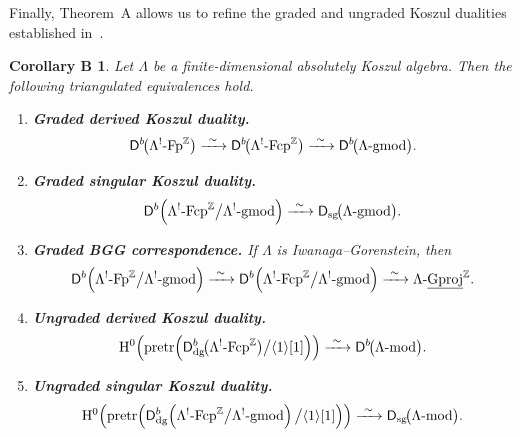 \documentclass[11pt]{article}
\newtheorem*{corollaryB}{\textbf{Corollary B}}
\theoremstyle{definition}
\theoremstyle{remark}
\begin{document}
\medskip

Finally, Theorem~A allows us to refine the graded and ungraded Koszul dualities established in~\cite{4}.

\begin{corollaryB}
Let \(\Lambda\) be a finite-dimensional absolutely Koszul algebra. Then the following triangulated equivalences hold.

\begin{enumerate}
\itemsep=0.4em

\item \textbf{Graded derived Koszul duality.}
\[
\mathsf{D}^{b}\!\bigl(
\Lambda^{!}\textup{-}\mathrm{Fp}^{\mathbb{Z}}
\bigr)
\xrightarrow{\ \sim\ }
\mathsf{D}^{b}\!\bigl(
\Lambda^{!}\textup{-}\mathrm{Fcp}^{\mathbb{Z}}
\bigr)
\xrightarrow{\ \sim\ }
\mathsf{D}^{b}\!\bigl(
\Lambda\textup{-}\mathrm{gmod}
\bigr).
\]

\item \textbf{Graded singular Koszul duality.}
\[
\mathsf{D}^{b}\!\left(
\Lambda^{!}\textup{-}\mathrm{Fcp}^{\mathbb{Z}}
\big/
\Lambda^{!}\textup{-}\mathrm{gmod}
\right)
\xrightarrow{\ \sim\ }
\mathsf{D}_{\mathrm{sg}}\!\bigl(
\Lambda\textup{-}\mathrm{gmod}
\bigr).
\]

\item \textbf{Graded BGG correspondence.}
If \(\Lambda\) is Iwanaga--Gorenstein, then
\[
\mathsf{D}^{b}\!\left(
\Lambda^{!}\textup{-}\mathrm{Fp}^{\mathbb{Z}}
\big/
\Lambda^{!}\textup{-}\mathrm{gmod}
\right)
\xrightarrow{\ \sim\ }
\mathsf{D}^{b}\!\left(
\Lambda^{!}\textup{-}\mathrm{Fcp}^{\mathbb{Z}}
\big/
\Lambda^{!}\textup{-}\mathrm{gmod}
\right)
\xrightarrow{\ \sim\ }
\Lambda\textup{-}\underline{\operatorname{Gproj}}^{\mathbb{Z}}.
\]

\item \textbf{Ungraded derived Koszul duality.}
\[
\mathrm{H}^{0}\!\left(
\operatorname{pretr}\!\left(
\mathsf{D}_{\mathrm{dg}}^{b}\!\bigl(
\Lambda^{!}\textup{-}\mathrm{Fcp}^{\mathbb{Z}}
\bigr)
\big/
\langle 1\rangle[1]
\right)
\right)
\xrightarrow{\ \sim\ }
\mathsf{D}^{b}\!\bigl(
\Lambda\textup{-}\mathrm{mod}
\bigr).
\]

\item \textbf{Ungraded singular Koszul duality.}
\[
\mathrm{H}^{0}\!\left(
\operatorname{pretr}\!\left(
\mathsf{D}_{\mathrm{dg}}^{b}\!\left(
\Lambda^{!}\textup{-}\mathrm{Fcp}^{\mathbb{Z}}
\big/
\Lambda^{!}\textup{-}\mathrm{gmod}
\right)
\big/
\langle 1\rangle[1]
\right)
\right)
\xrightarrow{\ \sim\ }
\mathsf{D}_{\mathrm{sg}}\!\bigl(
\Lambda\textup{-}\mathrm{mod}
\bigr).
\]


\end{enumerate}
\end{corollaryB}
\end{document}
